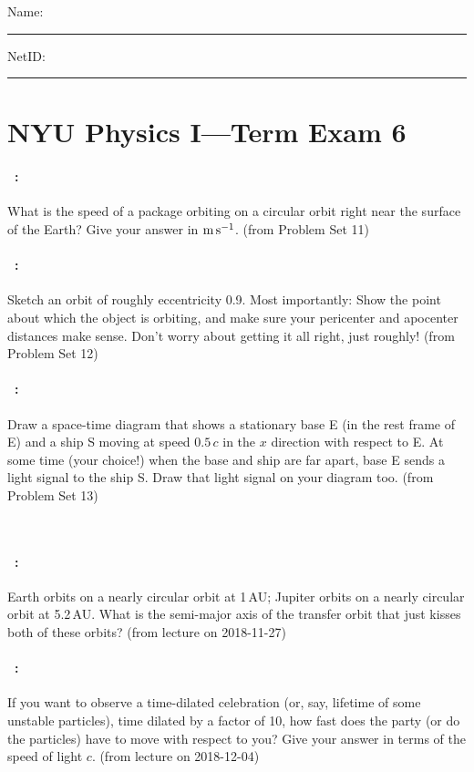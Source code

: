 \documentclass[12pt]{article} 
\begin{document}
\noindent
Name: \rule[-1ex]{0.55\textwidth}{0.1pt}
NetID: \rule[-1ex]{0.2\textwidth}{0.1pt}

\section*{NYU Physics I---Term Exam 6}

\paragraph{\problemname~\theproblem:}%
What is the speed of a package orbiting on a circular orbit right near
the surface of the Earth? Give your answer in $\mathrm{m}\,\mathrm{s}^{-1}$.
(from Problem Set 11)

\vfill

\paragraph{\problemname~\theproblem:}%
Sketch an orbit of roughly eccentricity 0.9. Most importantly: Show the
point about which the object is orbiting, and make sure your pericenter
and apocenter distances make sense. Don't worry about getting it all right,
just roughly!
(from Problem Set 12)

\vfill

\paragraph{\problemname~\theproblem:}%
Draw a space-time diagram that shows a stationary base E (in the rest
frame of E) and a ship S moving at speed $0.5\,c$ in the $x$
direction with respect to E. At some time (your choice!) when the base and ship are far
apart, base E sends a light signal to the ship S. Draw that light
signal on your diagram too.
(from Problem Set 13)

\vfill
~
\clearpage

\paragraph{\problemname~\theproblem:}%
Earth orbits on a nearly circular orbit at 1\,AU; Jupiter orbits
on a nearly circular orbit at 5.2\,AU. What is the semi-major axis
of the transfer orbit that just kisses both of these orbits?
(from lecture on 2018-11-27)

\vfill

\paragraph{\problemname~\theproblem:}%
If you want to observe a time-dilated celebration (or, say, lifetime
of some unstable particles), time dilated by a factor of 10, how fast
does the party (or do the particles) have to move with respect to you?
Give your answer in terms of the speed of light $c$.
(from lecture on 2018-12-04)
\end{document}
